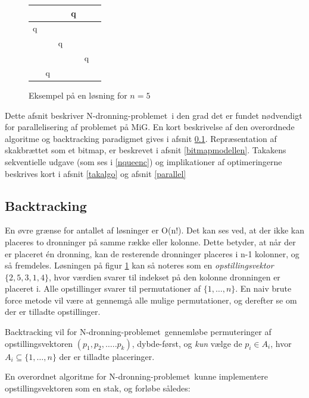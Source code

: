 \documentclass[final,a4paper,11pt]{article}
\newcommand{\mig}{MiG}
\newcommand{\nq}{N-dronning-problemet}
\def\chs#1{{\chessfont#1}}
\begin{document}
\begin{figure}
\begin{center}
\begin{tabular}{|c|c|c|c|c|c}
\hline	 &  & &   \chs{q} & \\
\hline	\chs{q} & &  &  & \\
\hline	 & & \chs{q} &  &  \\
\hline	 &  &  & & \chs{q} \\
\hline	 & \chs{q} & &  &  \\
\hline
\end{tabular}
\end{center}
\caption{Eksempel på en løsning for $n=5$}
\label{fig:nq5eks}
\end{figure}

Dette afsnit beskriver \nq\ i den grad det er fundet nødvendigt for parallelisering af problemet på \mig. En kort beskrivelse af den overordnede algoritme og backtracking paradigmet gives i afsnit \ref{backtracking}. Repræsentation af skakbrættet som et bitmap, er beskrevet i afsnit \ref{bitmapmodellen}. Takakens sekventielle udgave (som ses i \ref{nqueenc}) og implikationer af optimeringerne beskrives kort i afsnit \ref{takalgo} og afsnit \ref{parallel}


\subsection{Backtracking}\label{backtracking}

En øvre grænse for antallet af løsninger er O(n!). Det kan ses ved, at der ikke kan placeres to dronninger på samme række eller kolonne. Dette betyder, at når der er placeret én dronning, kan de resterende dronninger placeres i n-1 kolonner, og så fremdeles. Løsningen på figur \ref{fig:nq5eks} kan så noteres som en \emph{opstillingsvektor} $\{2,5,3,1,4\}$, hvor værdien svarer til indekset på den kolonne dronningen er placeret i. Alle opstillinger svarer til permutationer af $\{1,\ldots,n\}$. En naiv brute force metode vil være at gennemgå alle mulige permutationer, og derefter se om der er tilladte opstillinger.

Backtracking vil for \nq\ gennemløbe permuteringer af opstillingsvektoren  $(p_1,p_2,\ldots..p_k)$, dybde-først, og \emph{kun} vælge de $p_i \in A_i$, hvor $A_i\subseteq \{1,\ldots,n\}$ der er tilladte placeringer. 

En overordnet algoritme for \nq\ kunne implementere opstillingsvektoren som en stak, og forløbe således:
\end{document}

